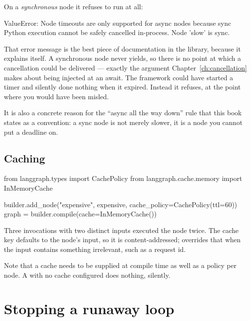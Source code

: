On a \emph{synchronous} node it refuses to run at all:

\begin{console}
ValueError: Node timeouts are only supported for async nodes because sync
Python execution cannot be safely cancelled in-process. Node 'slow' is sync.
\end{console}

\begin{note}
That error message is the best piece of documentation in the library, because it
explains itself. A synchronous node never yields, so there is no point at which a
cancellation could be delivered --- exactly the argument
Chapter~\ref{ch:cancellation} makes about  being injected at
an await. The framework could have started a timer and silently done nothing when
it expired. Instead it refuses, at the point where you would have been misled.

It is also a concrete reason for the ``async all the way down'' rule that this
book states as a convention: a sync node is not merely slower, it is a node you
cannot put a deadline on.
\end{note}

\subsection{Caching}
\label{sec:cache-policy}

\begin{python}[caption={Not paying twice for the same input}, label={lst:cache}]
from langgraph.types import CachePolicy
from langgraph.cache.memory import InMemoryCache

builder.add_node("expensive", expensive, cache_policy=CachePolicy(ttl=60))
graph = builder.compile(cache=InMemoryCache())
\end{python}

Three invocations with two distinct inputs executed the node twice. The cache key
defaults to the node's input, so it is content-addressed; 
overrides that when the input contains something irrelevant, such as a request
id.

Note that a cache needs to be supplied at compile time as well as a policy per
node. A  with no cache configured does nothing, silently.

\section{Stopping a runaway loop}
\label{sec:recursion}

